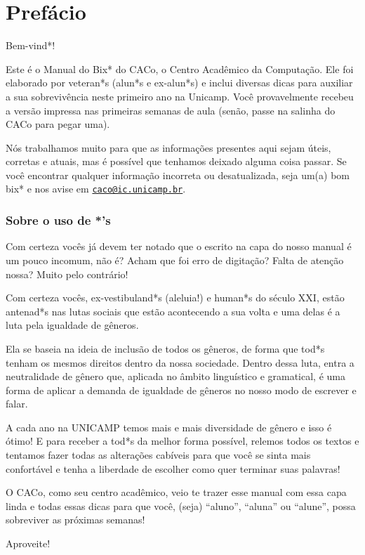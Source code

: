 \documentclass[a4paper,10pt,oldfontcommands]{memoir}
\newcommand{\email}[1]{\href{mailto:#1}{\nolinkurl{#1}}}
\begin{document}
\chapter{Prefácio}
\setlength{\parskip}{1em}

Bem-vind*!

Este é o Manual do Bix* do CACo, o Centro Acadêmico da Computação. Ele foi
elaborado por veteran*s (alun*s e ex-alun*s) e inclui diversas dicas para
auxiliar a sua sobrevivência neste primeiro ano na Unicamp. Você provavelmente
recebeu a versão impressa nas primeiras semanas de aula (senão, passe na salinha
do CACo para pegar uma).

Nós trabalhamos muito para que as informações presentes aqui sejam úteis,
corretas e atuais, mas é possível que tenhamos deixado alguma coisa passar. Se
você encontrar qualquer informação incorreta ou desatualizada, seja um(a) bom
bix* e nos avise em \email{caco@ic.unicamp.br}.

\subsection{Sobre o uso de *'s}
Com certeza vocês já devem ter notado que o escrito na capa do nosso manual é um
pouco incomum, não é?  Acham que foi erro de digitação? Falta de atenção nossa?
Muito pelo contrário!

Com certeza vocês, ex-vestibuland*s (aleluia!) e human*s do século XXI, estão
antenad*s nas lutas sociais que estão acontecendo a sua volta e uma delas é a
luta pela igualdade de gêneros.

Ela se baseia na ideia de inclusão de todos os gêneros, de forma que tod*s
tenham os mesmos direitos dentro da nossa sociedade. Dentro dessa luta, entra a
neutralidade de gênero que, aplicada no âmbito linguístico e gramatical, é uma
forma de aplicar a demanda de igualdade de gêneros no nosso modo de escrever e
falar.

A cada ano na UNICAMP temos mais e mais diversidade de gênero e isso é ótimo! E
para receber a tod*s da melhor forma possível, relemos todos os textos e
tentamos fazer todas as alterações cabíveis para que você se sinta mais
confortável e tenha a liberdade de escolher como quer terminar suas palavras!

O CACo, como seu centro acadêmico, veio te trazer esse manual com essa capa
linda e todas essas dicas para que você, (seja) ``aluno'', ``aluna'' ou
``alune'', possa sobreviver as próximas semanas!

Aproveite!
\end{document}
